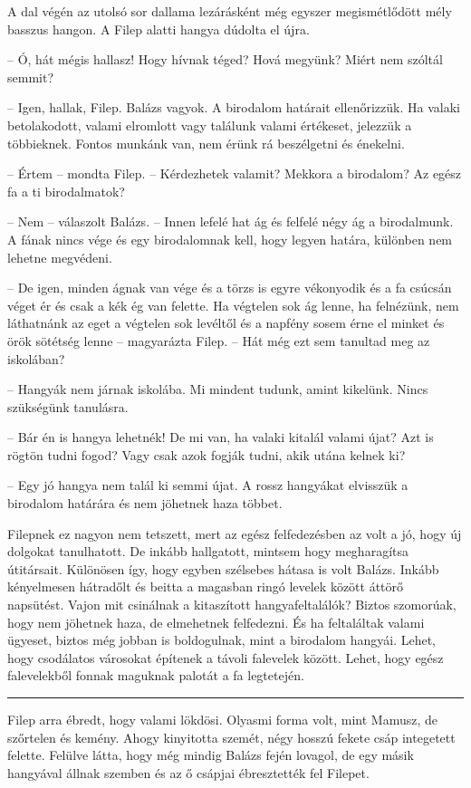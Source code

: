 \documentclass[10pt]{memoir}
\renewcommand{\pfbreakdisplay}{\bigskip \ding{166} \bigskip}
\newcommand{\secbreak}{\fancybreak{\pfbreakdisplay}\indent}
\begin{document}
A dal végén az utolsó sor dallama lezárásként még egyszer megismétlődött mély
basszus hangon. A Filep alatti hangya dúdolta el újra.

-- Ó, hát mégis hallasz! Hogy hívnak téged? Hová megyünk? Miért nem szóltál
semmit?

-- Igen, hallak, Filep. Balázs vagyok. A birodalom határait ellenőrizzük. Ha
valaki betolakodott, valami elromlott vagy találunk valami értékeset, jelezzük
a többieknek. Fontos munkánk van, nem érünk rá beszélgetni és énekelni.

-- Értem -- mondta Filep. -- Kérdezhetek valamit? Mekkora a birodalom? Az
egész fa a ti birodalmatok?

-- Nem -- válaszolt Balázs. -- Innen lefelé hat ág és felfelé négy ág a
birodalmunk. A fának nincs vége és egy birodalomnak kell, hogy legyen határa,
különben nem lehetne megvédeni.

-- De igen, minden ágnak van vége és a törzs is egyre vékonyodik és a fa
csúcsán véget ér és csak a kék ég van felette. Ha végtelen sok ág lenne, ha
felnézünk, nem láthatnánk az eget a végtelen sok levéltől és a napfény sosem
érne el minket és örök sötétség lenne -- magyarázta Filep. -- Hát még ezt sem
tanultad meg az iskolában?

-- Hangyák nem járnak iskolába. Mi mindent tudunk, amint kikelünk. Nincs
szükségünk tanulásra.

-- Bár én is hangya lehetnék! De mi van, ha valaki kitalál valami újat? Azt is
rögtön tudni fogod? Vagy csak azok fogják tudni, akik utána kelnek ki?

-- Egy jó hangya nem talál ki semmi újat. A rossz hangyákat elvisszük a
birodalom határára és nem jöhetnek haza többet.

Filepnek ez nagyon nem tetszett, mert az egész felfedezésben az volt a jó, hogy
új dolgokat tanulhatott. De inkább hallgatott, mintsem hogy megharagítsa
útitársait. Különösen így, hogy egyben szélsebes hátasa is volt Balázs. Inkább
kényelmesen hátradőlt és beitta a magasban ringó levelek között áttörő
napsütést. Vajon mit csinálnak a kitaszított hangyafeltalálók? Biztos
szomorúak, hogy nem jöhetnek haza, de elmehetnek felfedezni. És ha feltaláltak
valami ügyeset, biztos még jobban is boldogulnak, mint a birodalom hangyái.
Lehet, hogy csodálatos városokat építenek a távoli falevelek között. Lehet,
hogy egész falevelekből fonnak maguknak palotát a fa legtetején.

\secbreak

Filep arra ébredt, hogy valami lökdösi. Olyasmi forma volt, mint Mamusz, de
szőrtelen és kemény. Ahogy kinyitotta szemét, négy hosszú fekete csáp
integetett felette. Felülve látta, hogy még mindig Balázs fején lovagol, de egy
másik hangyával állnak szemben és az ő csápjai ébresztették fel Filepet.
\end{document}
